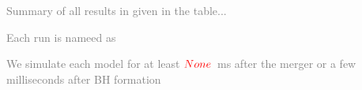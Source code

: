 \documentclass[11pt,a4paper,headinclude=true,DIV=14,BCOR=8mm,chapterprefix,listof=totoc,twoside,openright,abstracton]{scrbook}
\newcommand{\red}[1]{\textcolor{red}{#1}}
\newcommand{\gray}[1]{\textcolor{gray}{#1}}
\begin{document}
\gray{Summary of all results in given in the table...}

\gray{Each run is nameed as}

\gray{We simulate each model for at least $\red{None}$~ms after the merger or a few milliseconds after BH formation}


 
\appendix

\backmatter



\end{document}
